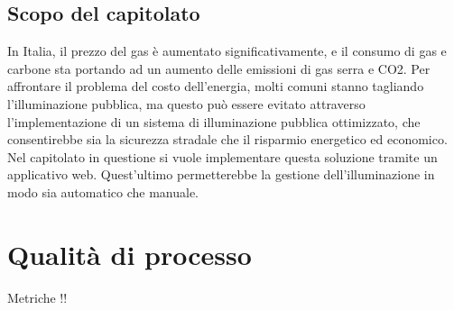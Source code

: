 \documentclass[12pt]{article}
\begin{document}
\subsection{Scopo del capitolato}
In Italia, il prezzo del gas è aumentato significativamente, e il consumo di gas e carbone sta portando ad un aumento delle emissioni di gas serra e CO2. Per affrontare il problema del costo dell'energia, molti comuni stanno tagliando l'illuminazione pubblica, ma questo può essere evitato attraverso l'implementazione di un sistema di illuminazione pubblica ottimizzato, che consentirebbe sia la sicurezza stradale che il risparmio energetico ed economico.
Nel capitolato in questione si vuole implementare questa soluzione tramite un applicativo web. Quest'ultimo permetterebbe la gestione dell'illuminazione in modo sia automatico che manuale.
\section{Qualità di processo}
Metriche !!
\end{document}
